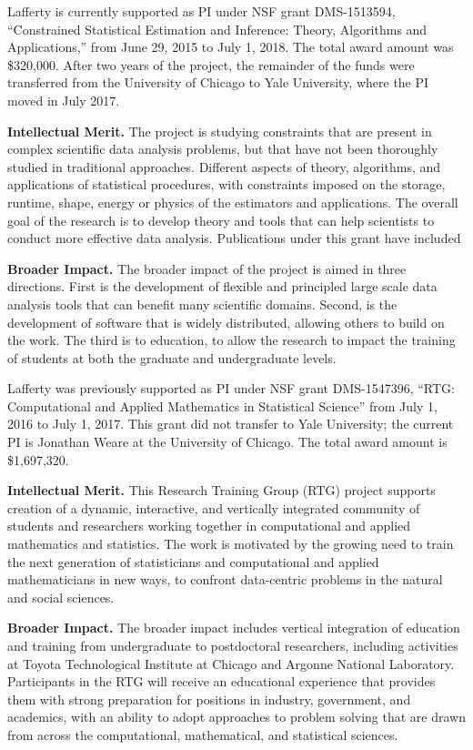 \vskip10pt
\noindent
Lafferty is currently supported as PI under NSF grant DMS-1513594,
``Constrained Statistical Estimation and Inference: Theory, Algorithms
and Applications,'' from June 29, 2015 to July 1, 2018. The
total award amount was \$320,000. After two years of the project, the
remainder of the funds were transferred from the University of Chicago
to Yale University, where the PI moved in July 2017.

{\bf Intellectual Merit.}  The project is studying constraints that
are present in complex scientific data analysis problems, but that
have not been thoroughly studied in traditional approaches. Different
aspects of theory, algorithms, and applications of statistical
procedures, with constraints imposed on the storage, runtime, shape,
energy or physics of the estimators and applications. The overall goal
of the research is to develop theory and tools that can help
scientists to conduct more effective data analysis. Publications 
under this grant have included 
\citep{ChatterjeeL18,MishraILH18,
abs-1803-01302,MishraLH17,YangB0L16,ChatterjeeDLZ16,ZhengL16,MishraZLH15,ZhengL15,ZhuL14}


{\bf Broader Impact.}  
The broader impact of the project is aimed in three directions.
First is the development of flexible and principled
large scale data analysis tools that can benefit many
scientific domains.  Second, is the development of software
that is widely distributed, allowing others to build on the work.
The third is to education, to allow the research to impact
the training of students at both the graduate and undergraduate
levels.


\vskip10pt
\noindent
Lafferty was previously supported as PI under NSF grant DMS-1547396,
``RTG: Computational and Applied Mathematics in Statistical Science''
from July 1, 2016 to July 1, 2017. This grant did not transfer
to Yale University; the current PI is Jonathan Weare at the 
University of Chicago. The total award amount is \$1,697,320.

{\bf Intellectual Merit.}  This Research Training Group (RTG) project
supports creation of a dynamic, interactive, and vertically integrated
community of students and researchers working together in
computational and applied mathematics and statistics. The work is
motivated by the growing need to train the next generation of
statisticians and computational and applied mathematicians in new
ways, to confront data-centric problems in the natural and social
sciences.

{\bf Broader Impact.}  
The broader impact includes vertical integration 
of education and training from undergraduate to postdoctoral
researchers, including activities at 
Toyota Technological Institute at Chicago and Argonne
National Laboratory. Participants in the RTG
will receive an educational experience that provides them with strong
preparation for positions in industry, government, and academics, with
an ability to adopt approaches to problem solving that are drawn from
across the computational, mathematical, and statistical sciences.

